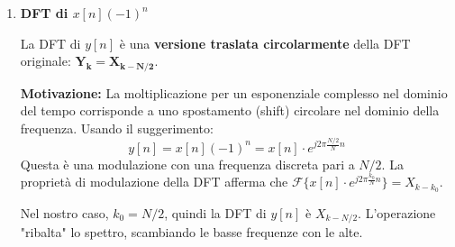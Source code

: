 \begin{soluzione}{25}
\begin{enumerate}
        \item \textbf{DFT di $x[n](-1)^n$}
        
        La DFT di $y[n]$ è una \textbf{versione traslata circolarmente} della DFT originale: $\mathbf{Y_k = X_{k - N/2}}$.
        
        \textbf{Motivazione:} La moltiplicazione per un esponenziale complesso nel dominio del tempo corrisponde a uno spostamento (shift) circolare nel dominio della frequenza. Usando il suggerimento:
        \[
            y[n] = x[n](-1)^n = x[n] \cdot e^{j2\pi \frac{N/2}{N} n}
        \]
        Questa è una modulazione con una frequenza discreta pari a $N/2$. La proprietà di modulazione della DFT afferma che $\mathcal{F}\{x[n] \cdot e^{j2\pi\frac{k_0}{N}n}\} = X_{k-k_0}$.
        
        Nel nostro caso, $k_0 = N/2$, quindi la DFT di $y[n]$ è $X_{k - N/2}$. L'operazione "ribalta" lo spettro, scambiando le basse frequenze con le alte.
        
    \end{enumerate}
\end{soluzione}